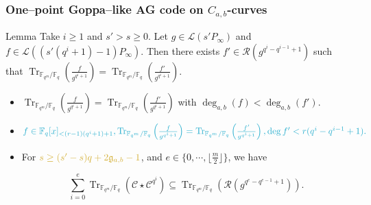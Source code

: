 \documentclass[
10pt, %
%
aspectratio=169, %
]{beamer}
\theoremstyle{plain}%
\theoremstyle{definition}
\theoremstyle{remark}
\newcommand{\calP}{\mathcal{P}}
\newcommand{\calL}{\mathcal{L}}
\newcommand{\calC}{\mathcal{C}}
\newcommand{\calR}{\mathcal{R}}
\newcommand{\calX}{\mathcal{X}}
\newcommand{\fq}{\mathbb{F}_{q}}
\newcommand{\Tr}[1]{\operatorname{Tr}_{\mathbb{F}_{q^m}/\fq}\left(#1\right)}
\newcommand{\GRS}{\operatorname{\mathsf{GRS}}}
\newcommand{\degab}[1]{\deg_{a,b}\left(#1\right)}
\begin{document}
\begin{frame}
	\frametitle{One--point Goppa--like AG code on $C_{a,b}$-curves}
	
	\begin{block}{Lemma \cite{lhotel2023goppa}}
		Take $i \geq 1$ and $s'>s \geq 0$. Let $g \in \calL\left(s'P_\infty\right)$ and $f \in \calL\left(\left(s'(q^i+1)-1\right)P_\infty\right)$. Then there exists $f' \in \calR\left(g^{q^i-q^{i-1}+1}\right)$ such that $\Tr{\frac{f}{g^{q^i+1}}} = \Tr{\frac{f'}{g^{q^i+1}}} $.
	\end{block}


	\begin{itemize}
		\item $\Tr{\frac{f}{g^{q^i+1}}} = \Tr{\frac{f'}{g^{q^i+1}}}$ with $\degab{f}<\degab{f'}$.
		\item[\textrightarrow] $\mathcolor{ballblue}{f \in \fq[x]_{<(r-1)(q^i+1)+1}, \Tr{\frac{f}{g^{q^i +1}}}=\Tr{\frac{f'}{g^{q^i +1}}}, \deg f'<r(q^i -q^{i-1}+1).}$
		\item For $\mathcolor{gold}{s \geq (s'-s)q+2\mathfrak{g}_{a,b}-1}$, and $e\in \{0,\cdots,\lfloor \frac{m}{2}\rfloor\}$, we have
		\vspace{-0.6em}
		
		$$ \sum \limits_{i=0}^{e}\Tr{\calC\star\calC^{q^i}} \subseteq \Tr{\calR(g^{q^{e}-q^{e-1}+1})}.$$
	\end{itemize}
\end{frame}
%
%		
\end{document}
